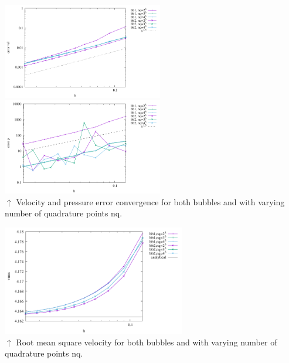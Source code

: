 \begin{center}
\includegraphics[width=7cm]{python_codes/fieldstone_75/results/burst/errors_v.pdf}
\includegraphics[width=7cm]{python_codes/fieldstone_75/results/burst/errors_p.pdf}\\
{\captionfont $\uparrow$ Velocity and pressure error convergence for both bubbles and with varying number of 
quadrature points nq.}
\end{center}


\begin{center}
\includegraphics[width=8cm]{python_codes/fieldstone_75/results/burst/vrms.pdf}\\
{\captionfont $\uparrow$ Root mean square velocity for both bubbles and with varying number of   
quadrature points nq.}
\end{center}


